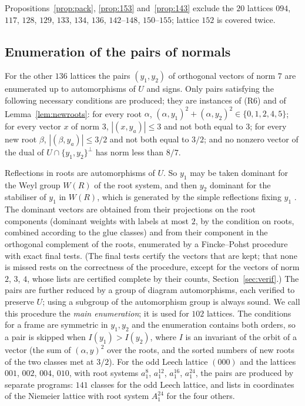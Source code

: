 \documentclass[11pt]{amsart}
\theoremstyle{definition}
\theoremstyle{remark}
\begin{document}
Propositions~\ref{prop:pack}, \ref{prop:153} and~\ref{prop:143} exclude the $20$ lattices $094$, $117$, $128$, $129$, $133$,
$134$, $136$, $142$--$148$, $150$--$155$; lattice $152$ is covered twice.

\subsection{Enumeration of the pairs of normals}\label{ssec:enum}
For the other $136$ lattices the pairs $(y_1,y_2)$ of orthogonal vectors of norm $7$ are enumerated up to automorphisms of $U$
and signs. Only pairs satisfying the following necessary conditions are produced; they are instances of (R6) and of
Lemma~\ref{lem:newroots}: for every root $\alpha$, $(\alpha,y_1)^2+(\alpha,y_2)^2\in\{0,1,2,4,5\}$; for every vector $x$ of
norm $3$, $|(x,y_a)|\le3$ and not both equal to $3$; for every new root $\beta$, $|(\beta,y_a)|\le3/2$ and not both equal to
$3/2$; and no nonzero vector of the dual of $U\cap\{y_1,y_2\}^\perp$ has norm less than $8/7$.

Reflections in roots are automorphisms of $U$. So $y_1$ may be taken dominant for the Weyl group $W(R)$ of the root system,
and then $y_2$ dominant for the stabiliser of $y_1$ in $W(R)$, which is generated by the simple reflections fixing $y_1$ \cite[\S1.12]{Hum}. The
dominant vectors are obtained from their projections on the root components (dominant weights with labels at most $2$, by
the condition on roots, combined according to the glue classes) and from their component in the orthogonal complement of the
roots, enumerated by a Fincke--Pohst procedure \cite{FP} with exact final tests. (The final tests certify the vectors that
are kept; that none is missed rests on the correctness of the procedure, except for the vectors of norm $2$, $3$, $4$,
whose lists are certified complete by their counts, Section~\ref{sec:verif}.) The pairs are further reduced by a group of diagram
automorphisms, each verified to preserve $U$; using a subgroup of the automorphism group is always sound. We call this
procedure the \emph{main enumeration}; it is used for $102$ lattices. The conditions
for a frame are symmetric in $y_1,y_2$ and the enumeration contains both orders, so a pair is skipped when $I(y_1)>I(y_2)$,
where $I$ is an invariant of the orbit of a vector (the sum of $(\alpha,y)^2$ over the roots, and the sorted numbers of new
roots of the two classes met at $3/2$). For the odd Leech lattice $(000)$ and the lattices $001$, $002$, $004$, $010$, with
root systems $a_1^8$, $a_1^{12}$, $a_1^{16}$, $a_1^{24}$, the pairs are produced by separate programs: $141$ classes for the
odd Leech lattice, and lists in coordinates of the Niemeier lattice with root system $A_1^{24}$ for the four others.
\end{document}
